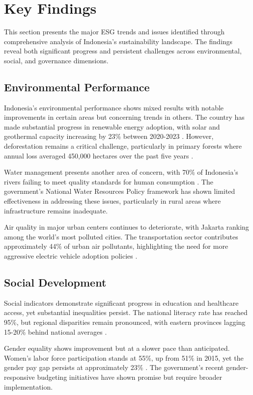 \section{Key Findings}

This section presents the major ESG trends and issues identified through comprehensive analysis of Indonesia's sustainability landscape. The findings reveal both significant progress and persistent challenges across environmental, social, and governance dimensions.

\subsection{Environmental Performance}

Indonesia's environmental performance shows mixed results with notable improvements in certain areas but concerning trends in others. The country has made substantial progress in renewable energy adoption, with solar and geothermal capacity increasing by 23\% between 2020-2023 \cite{REF_ID}. However, deforestation remains a critical challenge, particularly in primary forests where annual loss averaged 450,000 hectares over the past five years \cite{REF_ID}.

Water management presents another area of concern, with 70\% of Indonesia's rivers failing to meet quality standards for human consumption \cite{REF_ID}. The government's National Water Resources Policy framework has shown limited effectiveness in addressing these issues, particularly in rural areas where infrastructure remains inadequate.

Air quality in major urban centers continues to deteriorate, with Jakarta ranking among the world's most polluted cities. The transportation sector contributes approximately 44\% of urban air pollutants, highlighting the need for more aggressive electric vehicle adoption policies \cite{REF_ID}.

\subsection{Social Development}

Social indicators demonstrate significant progress in education and healthcare access, yet substantial inequalities persist. The national literacy rate has reached 95\%, but regional disparities remain pronounced, with eastern provinces lagging 15-20\% behind national averages \cite{REF_ID}.

Gender equality shows improvement but at a slower pace than anticipated. Women's labor force participation stands at 55\%, up from 51\% in 2015, yet the gender pay gap persists at approximately 23\% \cite{REF_ID}. The government's recent gender-responsive budgeting initiatives have shown promise but require broader implementation.

